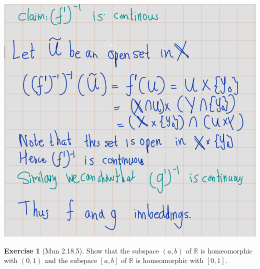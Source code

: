 \documentclass[
]{book}
\theoremstyle{definition}
\theoremstyle{definition}
\theoremstyle{definition}
\newtheorem{exercise}{Exercise}[chapter]
\theoremstyle{definition}
\theoremstyle{remark}
\begin{document}
\includegraphics{figures/Exercises/Ex 2.18/ex-4-3.png}

\begin{exercise}[Mun 2.18.5]
\protect\hypertarget{exr:unnamed-chunk-196}{}\label{exr:unnamed-chunk-196}Show that the subspace \((a, b)\) of \(\mathbb{R}\) is homeomorphic with \((0, 1)\) and the subspace \([a, b]\) of \(\mathbb{R}\) is homeomorphic with \([0, 1]\).
\end{exercise}
\end{document}
